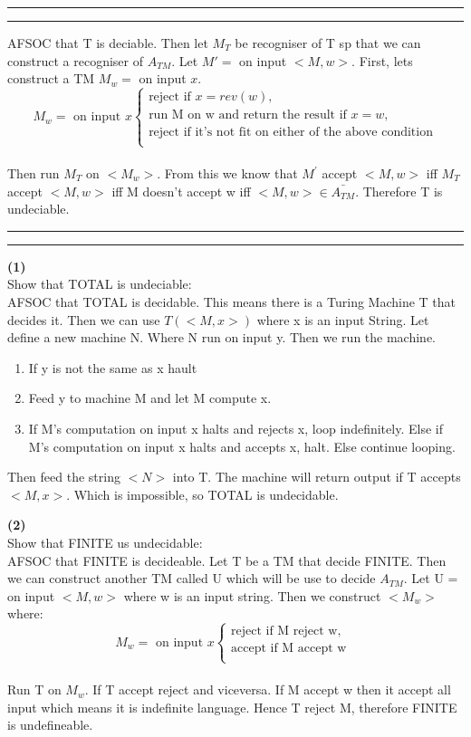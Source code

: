 \documentclass[a4paper, 11pt]{article}
\newcommand{\question}[2] {\vspace{.25in} \hrule\vspace{0.5em}
\noindent{\bf #1: #2} \vspace{0.5em}
\hrule \vspace{.10in}}
\renewcommand{\part}[1] {\vspace{.10in} {\bf (#1)}}
\begin{document}
\question{3}{Reverse on TM}
AFSOC that T is deciable. Then let $M_T$ be recogniser of T sp that we can construct a recogniser of $A_{TM}$. Let $M' = $ on input $<M,w>$. First, lets construct a TM $M_w = $ on input $x$.\\
\[
\text{$M_w = $ on input $x$}
\left\{
\begin{matrix}
\text{reject if } x = rev(w),\\ \text{run M on w and return the result if } x = w,\\ \text{reject if it's not fit on either of the above condition}\\
\end{matrix}
\right.
\]\\
Then run $M_T$ on $<M_w>$. From this we know that $M^{'}$ accept $<M,w>$ iff $M_T$ accept $<M,w>$ iff M doesn't accept w iff $<M,w> \in \bar{A_{TM}}$. Therefore T is undeciable.

\question{4}{Undecidability}
\part{1}\\
Show that TOTAL is undeciable:\\
AFSOC that TOTAL is decidable. This means there is a Turing Machine T that decides it. 
Then we can use $T(<M,x>)$ where x is an input String. Let define a new machine N. Where N run on input y. Then we run the machine.\\
\begin{enumerate}
	\item If y is not the same as x hault
	\item Feed y to machine M and let M compute x.
	\item If M's computation on input x halts and rejects x, loop indefinitely. Else if M's computation on input x halts and accepts x, halt. Else continue looping.
\end{enumerate}
Then feed the string $<N>$ into T. The machine will return output if T accepts $<M, x>$. Which is impossible, so TOTAL is undecidable.

\part{2}\\
Show that FINITE us undecidable:\\
AFSOC that FINITE is decideable. Let T be a TM that decide FINITE. Then we can construct another TM called U which will be use to decide $A_{TM}$. Let U = on input $<M,w>$ where w is an input string. Then we construct $<M_w>$ where:\\
\[
\text{$M_w = $ on input $x$}
\left\{
\begin{matrix}
\text{reject if M reject w},\\ \text{accept if M accept w }\\
\end{matrix}
\right.
\]\\
Run T on $M_w$. If T accept reject and viceversa. If M accept w then it accept all input which means it is indefinite language. Hence T reject M, therefore FINITE is undefineable.
\end{document}
